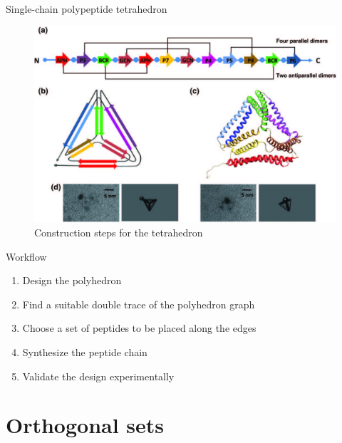 \documentclass{beamer}
\theoremstyle{plain}
\theoremstyle{remark}
\begin{document}
\begin{frame}{Single-chain polypeptide tetrahedron \cite{gradivsar2013design}}
	\begin{figure}
		\centering
		\includegraphics[width=\linewidth]{figures/tetrahedron_process}	
		\caption{Construction steps for the tetrahedron}
		\label{fig:tetrahedron}
	\end{figure}
\end{frame}

\begin{frame}{Workflow}
\begin{enumerate}
	\item Design the polyhedron
	\item {Find a suitable double trace of the polyhedron graph} %
	\item \alert<2->{Choose a set of peptides to be placed along the edges} %
	\item Synthesize the peptide chain
	\item Validate the design experimentally
\end{enumerate}
\end{frame}

\section{Orthogonal sets}
\end{document}
